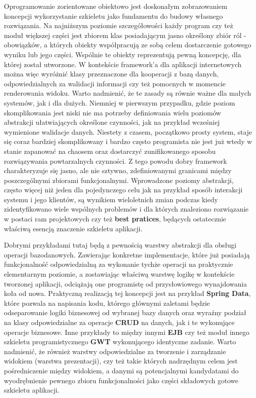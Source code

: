 	Oprogramowanie zorientowane obiektowo jest doskonałym zobrazowaniem koncepcji wykorzystanie szkieletu jako fundamentu do budowy własnego rozwiązania.
	Na najniższym poziomie szczegółowości każdy program czy też moduł większej części jest zbiorem klas posiadającym jasno określony zbiór ról - obowiązków, a 
	których obiekty współpracują ze sobą celem dostarczenie gotowego wyniku lub jego części. Wspólnie te obiekty reprezentują pewną koncepcję, dla której został utworzone.
	W kontekście framework'a dla aplikacji internetowych można więc wyróżnić klasy przeznaczone dla kooperacji z bazą danych, odpowiedzialnych za walidacji informacji czy też 
	pomocnych w momencie renderowania widoku. 
	Warto nadmienić, że te zasady są równie ważne dla małych systemów, jak i dla dużych. Niemniej w pierwszym przypadku, gdzie poziom skomplikowania jest niski nie ma 
	potrzeby definiowania wielu poziomów abstrakcji ułatwiających określone czynności, jak na przykład wcześniej wymienione walidacje danych. Niestety z czasem, początkowo
	prosty system, staje się coraz bardziej skomplikowany i bardzo często programista nie jest już wtedy w stanie zapanować na chaosem oraz dostarczyć zunifikowanego sposobu
	rozwiązywania powtarzalnych czynności. 
	Z tego powodu dobry framework charakteryzuje się jasno, ale nie sztywno, zdefiniowanymi granicami między poszczególnymi zbiorami funkcjonalnymi. Wprowadzone poziomy
	abstrakcji, często więcej niż jeden dla pojedynczego celu jak na przykład sposób interakcji systemu i jego klientów, są wynikiem wieloletnich zmian podczas kiedy zidentyfikowano
	wiele wspólnych problemów i dla których znaleziono rozwiązanie w postaci ram projektowych czy też \textbf{best pratices}, będących ostatecznie właściwą 
	esencją znaczenie szkieletu aplikacji\cite{framework_design_-_a_role_modeling_approach}.
	
	Dobrymi przykładami tutaj będą z pewnością warstwy abstrakcji dla obsługi operacji bazodanowych. Zawierając konkretne implementacje,
	które już posiadają funkcjonalność odpowiedzialną za wykonanie tychże operacji na praktycznie elementarnym poziomie, 
	a zostawiając właściwą warstwę logikę w kontekście tworzonej aplikacji, odciążają one programistę od przysłowiowego wynajdowania koła od nowa.
	Praktyczną realizacją tej koncepcji jest na przykład \textbf{Spring Data}, które pozwala na napisania kodu, którego głównymi zaletami
	będzie odseparowanie logiki biznesowej od wybranej bazy danych oraz wyraźny podział na klasy odpowiedzialne za operacje \textbf{CRUD} 
	na danych, jak i te wykonujące operacje biznesowe. Inne przykłady to między innymi \textbf{EJB} 
	czy też moduł innego szkieletu programistycznego \textbf{GWT} wykonującego identyczne zadanie. 
	Warto nadmienić, że również warstwy odpowiedzialne za tworzenie i zarządzanie widokiem (warstwa prezentacji),
	czy też takie których nadrzędnym celem jest pośredniczenie między widokiem, a danymi są potencjalnymi 
	kandydatami do wyodrębnienie pewnego zbioru funkcjonalności jako części składowych gotowe szkieletu aplikacji. 
	
